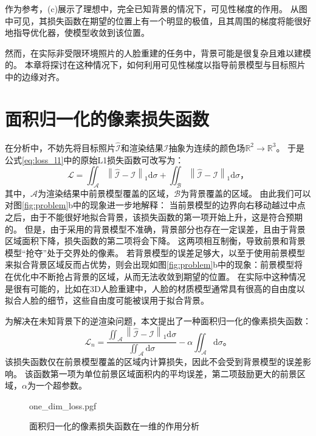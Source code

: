 作为参考，(c)展示了理想中，完全已知背景的情况下，可见性梯度的作用。
从图中可见，其损失函数在期望的位置上有一个明显的极值，且其周围的梯度将能很好地指导优化器，使模型收敛到该位置。

然而，在实际非受限环境照片的人脸重建的任务中，背景可能是很复杂且难以建模的。
本章将探讨在这种情况下，如何利用可见性梯度以指导前景模型与目标照片中的边缘对齐。

\section{面积归一化的像素损失函数}

在分析中，不妨先将目标照片$\hat{\mathcal{I}}$和渲染结果$\mathcal{I}$抽象为连续的颜色场$\mathbb{R}^2 \to \mathbb{R}^3$。
于是公式\ref{eq:loss_l1}中的原始L1损失函数可改写为：
\begin{equation}
\mathcal{L} = \iint_{\mathcal{A}} \left\| \hat{\mathcal{I}} - \mathcal{I} \right\|_1 \mathrm{d}\sigma +
\iint_{\mathcal{B}} \left\| \hat{\mathcal{I}} - \mathcal{I} \right\|_1 \mathrm{d}\sigma
\text{，}
\label{eq:loss_l1_area}
\end{equation}
其中，$\mathcal{A}$为渲染结果中前景模型覆盖的区域，$\mathcal{B}$为背景覆盖的区域。
由此我们可以对图\ref{fig:problem}b中的现象进一步地解释：
当前景模型的边界向右移动越过中点之后，由于不能很好地拟合背景，该损失函数的第一项开始上升，这是符合预期的。
但是，由于采用的背景模型不准确，背景部分也存在一定误差，且由于背景区域面积下降，损失函数的第二项将会下降。
这两项相互制衡，导致前景和背景模型“抢夺”处于交界处的像素。
若背景模型的误差足够大，以至于使用前景模型来拟合背景区域反而占优势，则会出现如图\ref{fig:problem}b中的现象：前景模型将在优化中不断抢占背景的区域，从而无法收敛到期望的位置。
在实际中这种情况是很有可能的，比如在3D人脸重建中，人脸的材质模型通常具有很高的自由度以拟合人脸的细节，这些自由度可能被误用于拟合背景。

为解决在未知背景下的逆渲染问题，本文提出了一种面积归一化的像素损失函数：
\begin{equation}
\mathcal{L}_n = \frac{\iint_{\mathcal{A}} \left\| \hat{\mathcal{I}} - \mathcal{I} \right\|_1 \mathrm{d}\sigma}
{\iint_{\mathcal{A}}\mathrm{d}\sigma}
-\alpha\iint_{\mathcal{A}}\mathrm{d}\sigma
\text{。}
\label{eq:loss_n}
\end{equation}
该损失函数仅在前景模型覆盖的区域内计算损失，因此不会受到背景模型的误差影响。
该函数第一项为单位前景区域面积内的平均误差，第二项鼓励更大的前景区域，$\alpha$为一个超参数。

\begin{figure}
\centering
{one_dim_loss.pgf}
\caption{面积归一化的像素损失函数在一维的作用分析}
\label{fig:one_dim_loss}
\end{figure}

